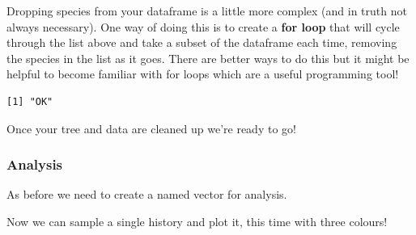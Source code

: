 \documentclass[
]{book}
\newenvironment{Shaded}{\begin{snugshade}}{\end{snugshade}}
\newcommand{\ControlFlowTok}[1]{\textcolor[rgb]{0.13,0.29,0.53}{\textbf{#1}}}
\newcommand{\DecValTok}[1]{\textcolor[rgb]{0.00,0.00,0.81}{#1}}
\newcommand{\KeywordTok}[1]{\textcolor[rgb]{0.13,0.29,0.53}{\textbf{#1}}}
\newcommand{\NormalTok}[1]{#1}
\newcommand{\OperatorTok}[1]{\textcolor[rgb]{0.81,0.36,0.00}{\textbf{#1}}}
\newcommand{\StringTok}[1]{\textcolor[rgb]{0.31,0.60,0.02}{#1}}
\begin{document}
Dropping species from your dataframe is a little more complex (and in truth not always necessary). One way of doing this is to create a \textbf{for loop} that will cycle through the list above and take a subset of the dataframe each time, removing the species in the list as it goes. There are better ways to do this but it might be helpful to become familiar with for loops which are a useful programming tool!

\begin{Shaded}
\end{Shaded}

\begin{verbatim}
[1] "OK"
\end{verbatim}

Once your tree and data are cleaned up we're ready to go!

\hypertarget{analysis}{%
\subsubsection{Analysis}\label{analysis}}

As before we need to create a named vector for analysis.

\begin{Shaded}
\end{Shaded}

Now we can sample a single history and plot it, this time with three colours!
\end{document}

